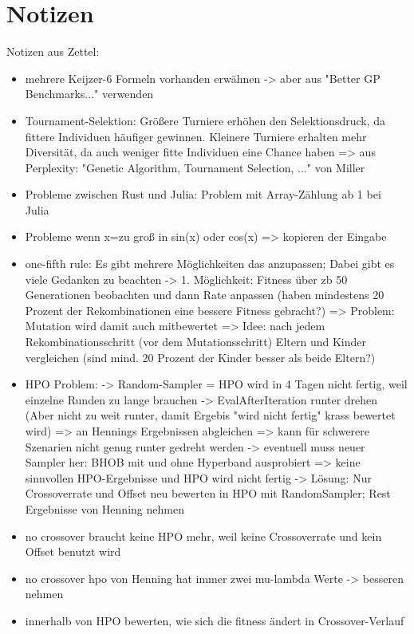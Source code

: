\chapter{Notizen}


Notizen aus Zettel:
\begin{itemize}
    \item mehrere Keijzer-6 Formeln vorhanden erwähnen -> aber aus "Better GP Benchmarks..." verwenden
    \item Tournament-Selektion: Größere Turniere erhöhen den Selektionsdruck, da fittere Individuen häufiger gewinnen.
    Kleinere Turniere erhalten mehr Diversität, da auch weniger fitte Individuen eine Chance haben
    => aus Perplexity: "Genetic Algorithm, Tournament Selection, ..." von Miller
    \item Probleme zwischen Rust und Julia: Problem mit Array-Zählung ab 1 bei Julia
    \item Probleme wenn x=zu groß in sin(x) oder cos(x) => kopieren der Eingabe
    \item one-fifth rule: Es gibt mehrere Möglichkeiten das anzupassen; Dabei gibt es viele Gedanken zu beachten
    -> 1. Möglichkeit: Fitness über zb 50 Generationen beobachten und dann Rate anpassen (haben mindestens 20 Prozent der Rekombinationen eine bessere Fitness gebracht?)
    => Problem: Mutation wird damit auch mitbewertet
    => Idee: nach jedem Rekombinationsschritt (vor dem Mutationsschritt) Eltern und Kinder vergleichen (sind mind. 20 Prozent der Kinder besser als beide Eltern?)
    \item HPO Problem: 
    -> Random-Sampler = HPO wird in 4 Tagen nicht fertig, weil einzelne Runden zu lange brauchen
    -> EvalAfterIteration runter drehen (Aber nicht zu weit runter, damit Ergebis "wird nicht fertig" krass bewertet wird) => an Hennings Ergebnissen abgleichen => kann für schwerere Szenarien nicht genug runter gedreht werden
    -> eventuell muss neuer Sampler her: BHOB mit und ohne Hyperband ausprobiert => keine sinnvollen HPO-Ergebnisse und HPO wird nicht fertig
    -> Lösung: Nur Crossoverrate und Offset neu bewerten in HPO mit RandomSampler; Rest Ergebnisse von Henning nehmen
    \item no crossover braucht keine HPO mehr, weil keine Crossoverrate und kein Offset benutzt wird
    \item no crossover hpo von Henning hat immer zwei mu-lambda Werte -> besseren nehmen
    \item innerhalb von HPO bewerten, wie sich die fitness ändert in Crossover-Verlauf
\end{itemize}

